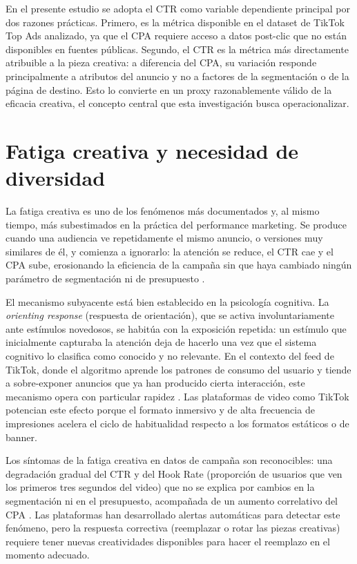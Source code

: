 \documentclass[12pt, a4paper]{report}
\begin{document}
En el presente estudio se adopta el CTR como variable dependiente principal por dos razones prácticas.
Primero, es la métrica disponible en el dataset de TikTok Top Ads analizado, ya que el CPA requiere acceso
a datos post-clic que no están disponibles en fuentes públicas. Segundo, el CTR es la métrica más
directamente atribuible a la pieza creativa: a diferencia del CPA, su variación responde principalmente
a atributos del anuncio y no a factores de la segmentación o de la página de destino. Esto lo convierte
en un proxy razonablemente válido de la eficacia creativa, el concepto central que esta investigación
busca operacionalizar.

\section{Fatiga creativa y necesidad de diversidad}

La fatiga creativa es uno de los fenómenos más documentados y, al mismo tiempo, más subestimados
en la práctica del performance marketing. Se produce cuando una audiencia ve repetidamente el mismo
anuncio, o versiones muy similares de él, y comienza a ignorarlo: la atención se reduce, el CTR cae
y el CPA sube, erosionando la eficiencia de la campaña sin que haya cambiado ningún parámetro de
segmentación ni de presupuesto \citep{singular2025}.

El mecanismo subyacente está bien establecido en la psicología cognitiva. La \textit{orienting
response} (respuesta de orientación), que se activa involuntariamente ante estímulos novedosos, se
habitúa con la exposición repetida: un estímulo que inicialmente capturaba la atención deja de
hacerlo una vez que el sistema cognitivo lo clasifica como conocido y no relevante. En el contexto
del feed de TikTok, donde el algoritmo aprende los patrones de consumo del usuario y tiende a
sobre-exponer anuncios que ya han producido cierta interacción, este mecanismo opera con particular
rapidez \citep{tiktok_audiovisual2025}. Las plataformas de video como TikTok potencian este efecto porque
el formato inmersivo y de alta frecuencia de impresiones acelera el ciclo de habitualidad respecto a
los formatos estáticos o de banner.

Los síntomas de la fatiga creativa en datos de campaña son reconocibles: una degradación gradual del
CTR y del Hook Rate (proporción de usuarios que ven los primeros tres segundos del video) que no se
explica por cambios en la segmentación ni en el presupuesto, acompañada de un aumento correlativo del
CPA \citep{adlib2022}. Las plataformas han desarrollado alertas automáticas para detectar este
fenómeno, pero la respuesta correctiva (reemplazar o rotar las piezas creativas) requiere tener
nuevas creatividades disponibles para hacer el reemplazo en el momento adecuado.
\end{document}
